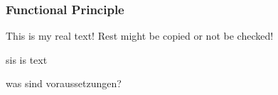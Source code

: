 \subsubsection{Functional Principle} \label{subsection:license-samsung-functional}
This is my real text! Rest might be copied or not be checked!


sis is text

was sind voraussetzungen? \newline
